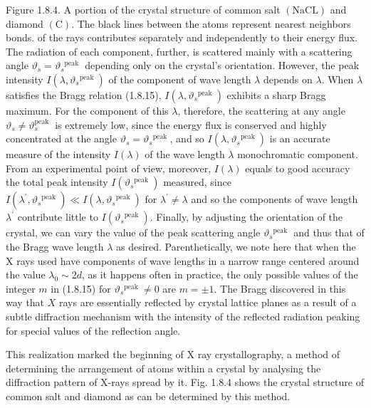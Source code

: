 \documentclass{article}
\begin{document}
Figure 1.8.4. A portion of the crystal structure of common salt $(\mathrm{NaCL})$ and diamond $(\mathrm{C})$. The black lines between the atoms represent nearest neighbors bonds.
of the rays contributes separately and independently to their energy flux. The radiation of each component, further, is scattered mainly with a scattering angle $\vartheta_{s}=\vartheta_{s}{ }^{\text {peak }}$ depending only on the crystal's orientation. However, the peak intensity $I\left(\lambda, \vartheta_{s}{ }^{\text {peak }}\right)$ of the component of wave length $\lambda$ depends on $\lambda$. When $\lambda$ satisfies the Bragg relation (1.8.15), $I\left(\lambda, \vartheta_{s}{ }^{\text {peak }}\right)$ exhibits a sharp Bragg maximum. For the component of this $\lambda$, therefore, the scattering at any angle $\vartheta_{s} \neq \vartheta_{s}^{\text {peak }}$ is extremely low, since the energy flux is conserved and highly concentrated at the angle $\vartheta_{s}=\vartheta_{s}{ }^{\text {peak }}$, and so $I\left(\lambda, \vartheta_{s}{ }^{\text {peak }}\right)$ is an accurate measure of the intensity $I(\lambda)$ of the wave length $\lambda$ monochromatic component. From an experimental point of view, moreover, $I(\lambda)$ equals to good accuracy the total peak intensity $I\left(\vartheta_{s}{ }^{\text {peak }}\right)$ measured, since $I\left(\lambda^{\prime}, \vartheta_{s}{ }^{\text {peak }}\right) \ll I\left(\lambda, \vartheta_{s}{ }^{\text {peak }}\right)$ for $\lambda^{\prime} \neq \lambda$ and so the components of wave length $\lambda^{\prime}$ contribute little to $I\left(\vartheta_{s}{ }^{\text {peak }}\right)$. Finally, by adjusting the orientation of the crystal, we can vary the value of the peak scattering angle $\vartheta_{s}{ }^{\text {peak }}$ and thus that of the Bragg wave length $\lambda$ as desired. Parenthetically, we note here that when the X rays used have components of wave lengths in a narrow range centered around the value $\lambda_{0} \sim 2 d$, as it happens often in practice, the only possible values
of the integer $m$ in (1.8.15) for $\vartheta_{s}{ }^{\text {peak }} \neq 0$ are $m= \pm 1$.
The Bragg discovered in this way that $X$ rays are essentially reflected by crystal lattice planes as a result of a subtle diffraction mechanism with the intensity of the reflected radiation peaking for special values of the reflection angle.

This realization marked the beginning of X ray crystallography, a method of determining the arrangement of atoms within a crystal by analysing the diffraction pattern of X-rays spread by it. Fig. 1.8.4 shows the crystal structure of common salt and diamond as can be determined by this method.
\end{document}
